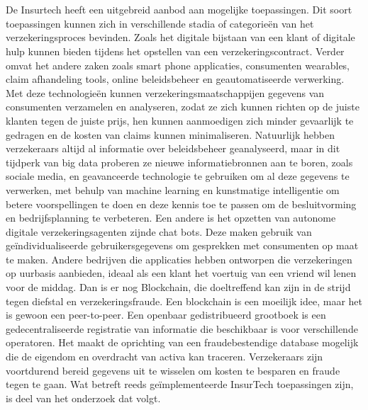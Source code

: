 \section{}
\label{sec:bestaande-toepassingen}
De Insurtech heeft een uitgebreid aanbod aan mogelijke toepassingen. Dit soort toepassingen kunnen zich in verschillende stadia of categorieën van het verzekeringsproces bevinden. Zoals het digitale bijstaan van een klant of digitale hulp kunnen bieden tijdens het opstellen van een verzekeringscontract. Verder omvat het andere zaken zoals smart phone applicaties, consumenten wearables, claim afhandeling tools, online beleidsbeheer en geautomatiseerde verwerking. Met deze technologieën kunnen verzekeringsmaatschappijen gegevens van consumenten verzamelen en analyseren, zodat ze zich kunnen richten op de juiste klanten tegen de juiste prijs, hen kunnen aanmoedigen zich minder gevaarlijk te gedragen en de kosten van claims kunnen minimaliseren. Natuurlijk hebben verzekeraars altijd al informatie over beleidsbeheer geanalyseerd, maar in dit tijdperk van big data proberen ze nieuwe informatiebronnen aan te boren, zoals sociale media, en geavanceerde technologie te gebruiken om al deze gegevens te verwerken, met behulp van machine learning en kunstmatige intelligentie om betere voorspellingen te doen en deze kennis toe te passen om de besluitvorming en bedrijfsplanning te verbeteren. Een andere is het opzetten van autonome digitale verzekeringsagenten zijnde chat bots. Deze maken gebruik van geïndividualiseerde gebruikersgegevens om gesprekken met consumenten op maat te maken. Andere bedrijven die applicaties hebben ontworpen die verzekeringen op uurbasis aanbieden, ideaal als een klant het voertuig van een vriend wil lenen voor de middag. Dan is er nog Blockchain, die doeltreffend kan zijn in de strijd tegen diefstal en verzekeringsfraude. Een blockchain is een moeilijk idee, maar het is gewoon een peer-to-peer. Een openbaar gedistribueerd grootboek is een gedecentraliseerde registratie van informatie die beschikbaar is voor verschillende operatoren. Het maakt de oprichting van een fraudebestendige database mogelijk die de eigendom en overdracht van activa kan traceren. Verzekeraars zijn voortdurend bereid gegevens uit te wisselen om kosten te besparen en fraude tegen te gaan.
Wat betreft reeds geïmplementeerde InsurTech toepassingen zijn, is deel van het onderzoek dat volgt.
